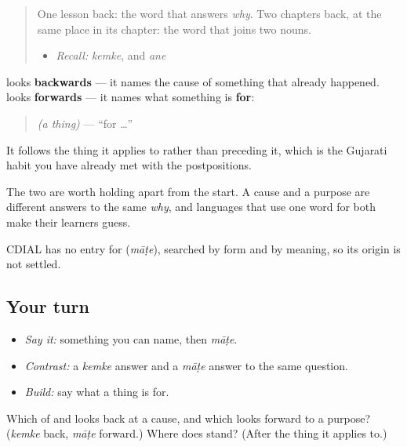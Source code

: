 \label{lesson:GU-C34-maate}



\begin{quote}
One lesson back: the word that answers \emph{why}. Two chapters back, at the same place in its chapter: the word that joins two nouns.

\begin{itemize}
\raggedright
  \item \emph{Recall:} \emph{kemke}, and \emph{ane}
\end{itemize}
\end{quote}

\begin{cousinweb}
\textbf{} looks \textbf{backwards} — it names the cause of something that already happened. \textbf{} looks \textbf{forwards} — it names what something is \textbf{for}:

\begin{quote}
\emph{(a thing)} \textbf{} — \textquotedblleft{}for …\textquotedblright{}
\end{quote}

It follows the thing it applies to rather than preceding it, which is the Gujarati habit you have already met with the postpositions.

The two are worth holding apart from the start. A cause and a purpose are different answers to the same \emph{why}, and languages that use one word for both make their learners guess.

CDIAL has no entry for \textbf{} (\emph{māṭe}), searched by form and by meaning, so its origin is not settled.
\end{cousinweb}

\subsection*{Your turn}
\begin{itemize}
\raggedright
  \item \emph{Say it:} something you can name, then \emph{māṭe}.
  \item \emph{Contrast:} a \emph{kemke} answer and a \emph{māṭe} answer to the same question.
  \item \emph{Build:} say what a thing is for.
\end{itemize}

\begin{tcolorbox}[breakable,colback=teal!4,colframe=teal!35!black,title={Before you move on}]
Which of \textbf{} and \textbf{} looks back at a cause, and which looks forward to a purpose? (\emph{kemke} back, \emph{māṭe} forward.) Where does \textbf{} stand? (After the thing it applies to.)
\end{tcolorbox}

